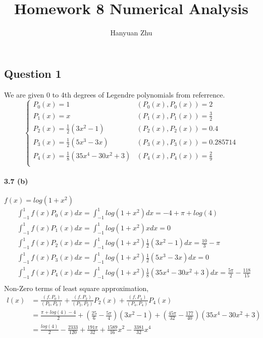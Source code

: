 \documentclass{article}
\title{Homework 8 Numerical Analysis}
\author{Hanyuan Zhu}
\date{}
\begin{document}
\maketitle

\subsection*{ Question 1}

We are given 0 to 4th degrees of Legendre polynomials from referrence.
\begin{equation}
  \begin{cases}
    P_0(x) = 1 & (P_0(x), P_0(x)) = 2 \\
    P_1(x) = x & (P_1(x), P_1(x)) = \frac{3}{2} \\
    P_2(x) = \frac{1}{2}(3 x ^2 - 1) & (P_2(x), P_2(x)) = 0.4\\
    P_3(x) = \frac{1}{2} (5 x^3 -3 x) & (P_3(x), P_3(x)) = 0.285714  \\
    P_4(x) = \frac{1}{8} (35 x^4 -30 x^2 + 3)  & (P_4(x), P_4(x)) = \frac{2}{9} \\
  \end{cases}
\end{equation}


\paragraph{3.7 (b)} $f(x) = log(1 + x^2) $
\begin{equation}
  \begin{split}
    &\int_{-1}^{1} f(x) P_0(x) dx = \int_{-1}^{1} log(1 + x^2)dx  = -4 + \pi + log(4)  \\
    &\int_{-1}^{1} f(x) P_1(x) dx = \int_{-1}^{1} log(1 + x^2) x dx = 0\\
    &\int_{-1}^{1} f(x) P_2(x) dx = \int_{-1}^{1} log(1 + x^2) \frac{1}{2}(3 x ^2 - 1) dx = \frac{10}{3} - \pi \\
    &\int_{-1}^{1} f(x) P_3(x) dx = \int_{-1}^{1} log(1 + x^2) \frac{1}{2} (5 x^3 -3 x) dx = 0\\
    &\int_{-1}^{1} f(x) P_4(x) dx = \int_{-1}^{1} log(1 + x^2) \frac{1}{8} (35 x^4 -30 x^2 + 3) dx = \frac{5 \pi}{2} - \frac{118}{15} \\
  \end{split}
\end{equation}
Non-Zero terms of least square approximation,
\begin{equation}
  \begin{split}
    l(x) &= \frac{(f,P_0)}{(P_0,P_0)} + \frac{(f,P_2)}{(P_2,P_2)} P_2 (x) + \frac{(f,P_4)}{(P_4,P_4)} P_4 (x)\\
    &= \frac{\pi + log(4) -4 }{2} + (\frac{25}{6} - \frac{5\pi}{4})(3 x ^2 - 1) + (\frac{45 \pi}{32} - \frac{177}{40}) (35 x^4 -30 x^2 + 3)\\
    &= \frac{log(4)}{2} - \frac{2333}{120}+  \frac{191 \pi}{32} + \frac{1589}{16} x^2  - \frac{3381}{32}  x^4
  \end{split}
\end{equation}
\end{document}
